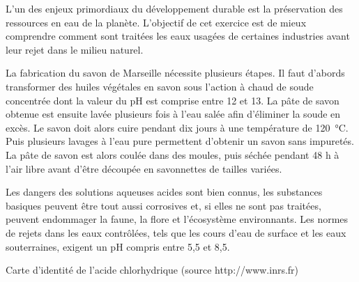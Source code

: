 
\medskip
L'un des enjeux primordiaux du développement durable est la préservation des ressources en eau de la planète.
L'objectif de cet exercice est de mieux comprendre comment sont traitées les eaux usagées de certaines industries avant leur rejet dans le milieu naturel.

\medskip
La fabrication du savon de Marseille nécessite plusieurs étapes.
Il faut d'abords transformer des huiles végétales en savon sous l'action à chaud de soude concentrée dont la valeur du pH est comprise entre 12 et 13.
La pâte de savon obtenue est ensuite lavée plusieurs fois à l'eau salée afin d'éliminer la soude en excès.
Le savon doit alors cuire pendant dix jours à une température de \qty{120}{\degreeCelsius}.
Puis plusieurs lavages à l'eau pure permettent d'obtenir un savon sans impuretés.
La pâte de savon est alors coulée dans des moules, puis séchée pendant 48 h à l'air libre avant d'être découpée en savonnettes de tailles variées.

\medskip
Les dangers des solutions aqueuses acides sont bien connus, les substances basiques peuvent être tout aussi corrosives et, si elles ne sont pas traitées, peuvent endommager la faune, la flore et l'écosystème environnants.
Les normes de rejets dans les eaux contrôlées, tels que les cours d'eau de surface et les eaux souterraines, exigent un pH compris entre 5,5 et 8,5.



\medskip
\begin{boite}
  \begin{center}  
    Carte d'identité de l'acide chlorhydrique (source http://www.inrs.fr)
  \end{center}
  
\end{boite}

